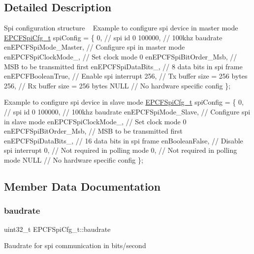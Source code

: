 \subsection{Detailed Description}
Spi configuration structure ~\newline
Example to configure spi device in master mode \mbox{\hyperlink{structEPCFSpiCfg__t}{E\+P\+C\+F\+Spi\+Cfg\+\_\+t}} spi\+Config = \{ 0, // spi id 0 100000, // 100khz baudrate en\+E\+P\+C\+F\+Spi\+Mode\+\_\+\+Master, // Configure spi in master mode en\+E\+P\+C\+F\+Spi\+Clock\+Mode\+\_, // Set clock mode 0 en\+E\+P\+C\+F\+Spi\+Bit\+Order\+\_\+\+Msb, // M\+SB to be transmitted first en\+E\+P\+C\+F\+Spi\+Data\+Bits\+\_, // 8 data bits in spi frame en\+E\+P\+C\+F\+Boolean\+True, // Enable spi interrupt 256, // Tx buffer size = 256 bytes 256, // Rx buffer size = 256 bytes N\+U\+LL // No hardware specific config \};

Example to configure spi device in slave mode \mbox{\hyperlink{structEPCFSpiCfg__t}{E\+P\+C\+F\+Spi\+Cfg\+\_\+t}} spi\+Config = \{ 0, // spi id 0 100000, // 100khz baudrate en\+E\+P\+C\+F\+Spi\+Mode\+\_\+\+Slave, // Configure spi in slave mode en\+E\+P\+C\+F\+Spi\+Clock\+Mode\+\_, // Set clock mode 0 en\+E\+P\+C\+F\+Spi\+Bit\+Order\+\_\+\+Msb, // M\+SB to be transmitted first en\+E\+P\+C\+F\+Spi\+Data\+Bits\+\_, // 16 data bits in spi frame en\+Boolean\+False, // Disable spi interrupt 0, // Not required in polling mode 0, // Not required in polling mode N\+U\+LL // No hardware specific config \}; 

\subsection{Member Data Documentation}
\mbox{\label{structEPCFSpiCfg__t_a365a79989b5dbf272f6ead275f3eacc8}} 
\subsubsection{\texorpdfstring{baudrate}{baudrate}}
{\footnotesize\ttfamily uint32\+\_\+t E\+P\+C\+F\+Spi\+Cfg\+\_\+t\+::baudrate}

Baudrate for spi communication in bits/second \mbox{\label{structEPCFSpiCfg__t_ab112623bd3baa256760859df415fb028}} 
